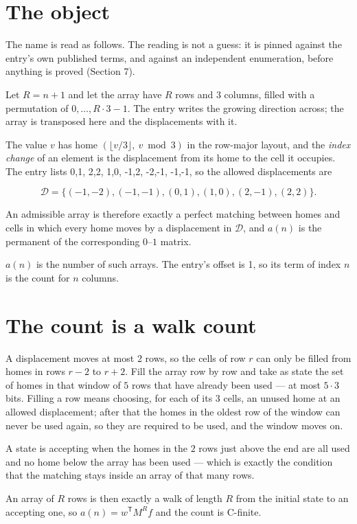 \documentclass[11pt]{article}
\theoremstyle{definition}
\begin{document}
\section{The object}

The name is read as follows. The reading is not a guess: it is pinned against the entry's own published terms, and against an independent enumeration, before anything is proved (Section 7).

Let $R = n + 1$ and let the array have $R$ rows and $3$ columns, filled with a permutation of $0,\dots,R\cdot3-1$. The entry writes the growing direction across; the array is transposed here and the displacements with it.

The value $v$ has home $(\lfloor v/3\rfloor,\ v \bmod 3)$ in the row-major layout, and the {\itshape index change} of an element is the displacement from its home to the cell it occupies. The entry lists 0,1, 2,2, 1,0, -1,2, -2,-1, -1,-1, so the allowed displacements are

\[\mathcal{D} = \{(-1,-2), (-1,-1), (0,1), (1,0), (2,-1), (2,2)\}.\]

An admissible array is therefore exactly a perfect matching between homes and cells in which every home moves by a displacement in $\mathcal{D}$, and $a(n)$ is the permanent of the corresponding $0$--$1$ matrix.

$a(n)$ is the number of such arrays. The entry's offset is 1, so its term of index $n$ is the count for $n$ columns.

\section{The count is a walk count}

A displacement moves at most $2$ rows, so the cells of row $r$ can only be filled from homes in rows $r-2$ to $r+2$. Fill the array row by row and take as state the set of homes in that window of $5$ rows that have already been used --- at most $5\cdot3$ bits. Filling a row means choosing, for each of its $3$ cells, an unused home at an allowed displacement; after that the homes in the oldest row of the window can never be used again, so they are required to be used, and the window moves on.

A state is accepting when the homes in the $2$ rows just above the end are all used and no home below the array has been used --- which is exactly the condition that the matching stays inside an array of that many rows.

An array of $R$ rows is then exactly a walk of length $R$ from the initial state to an accepting one, so $a(n) = w^{\mathsf T}M^{R}f$ and the count is C-finite.
\end{document}
